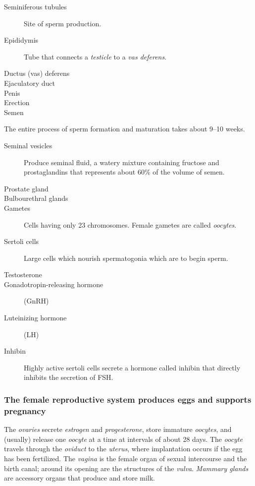 \documentclass[11pt]{article}
\begin{document}
\begin{description}
\item[{Seminiferous tubules}] Site of sperm production.
\item[{Epididymis}] Tube that connects a \emph{testicle} to a \emph{vas deferens}.
\item[{Ductus (vas) deferens}] 

\item[{Ejaculatory duct}] 


\item[{Penis}] 

\item[{Erection}] 

\item[{Semen}] 
\end{description}

The entire process of sperm formation and maturation takes about 9--10 weeks.

\begin{description}
\item[{Seminal vesicles}] Produce seminal fluid, a watery mixture containing
fructose and prostaglandins that represents about 60\% of the volume of
semen.
\item[{Prostate gland}] 

\item[{Bulbourethral glands}] 

\item[{Gametes}] Cells having only 23 chromosomes. Female gametes are called
\emph{oocytes}.
\item[{Sertoli cells}] Large cells which nourish spermatogonia which are to begin
sperm.

\item[{Testosterone}] 

\item[{Gonadotropin-releasing hormone}] (GnRH)
\item[{Luteinizing hormone}] (LH)
\item[{Inhibin}] Highly active sertoli cells secrete a hormone called inhibin that
directly inhibits the secretion of FSH.
\end{description}

\subsubsection{The female reproductive system produces eggs and supports pregnancy}
\label{sec:org8a33cb8}
The \emph{ovaries} secrete \emph{estrogen} and \emph{progesterone}, store immature \emph{oocytes}, and
(usually) release one \emph{oocyte} at a time at intervals of about 28 days. The \emph{oocyte}
travels through the \emph{oviduct} to the \emph{uterus}, where implantation occurs if the egg
has been fertilized. The \emph{vagina} is the female organ of sexual intercourse and
the birth canal; around its opening are the structures of the \emph{vulva}. \emph{Mammary
glands} are accessory organs that produce and store milk.
\end{document}
